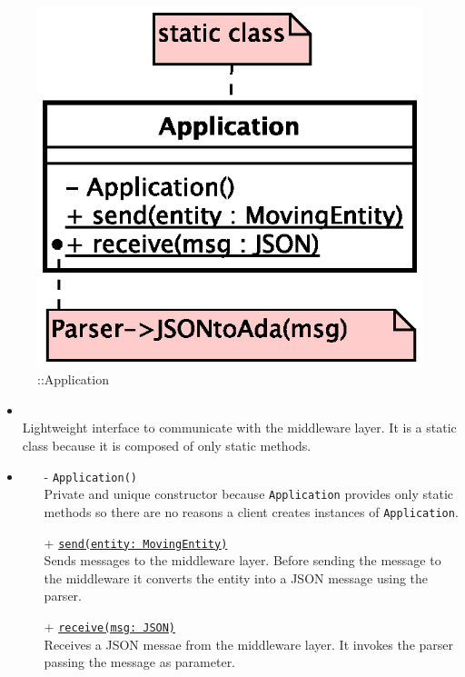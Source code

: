 \begin{figure}[h]
\centering
\includegraphics[scale=0.6,keepaspectratio]{images/solution/app/backend/application.eps}
\caption{\pInterface::Application}
\label{fig:sd-app-application}
\end{figure}
\FloatBarrier
\begin{itemize}
  \item \textbf{\descr} \\
    Lightweight interface to communicate with the middleware layer.
    It is a static class because it is composed of only static methods.
  \item \textbf{\ops}
  \begin{itemize}
   \item[-] \texttt{Application()} \\
   Private and unique constructor because \texttt{Application} provides 
   only static methods so there are no reasons a client creates instances 
   of \texttt{Application}.
    \item[+] \texttt{\underline{send(entity: MovingEntity)}} \\
    Sends messages to the middleware layer. Before sending the message to the
    middleware it converts the entity into a JSON message using the parser.
    \item[+] \texttt{\underline{receive(msg: JSON)}} \\
    Receives a JSON messae from the middleware layer. It invokes the parser 
    passing the message as parameter.
  \end{itemize}
\end{itemize}
